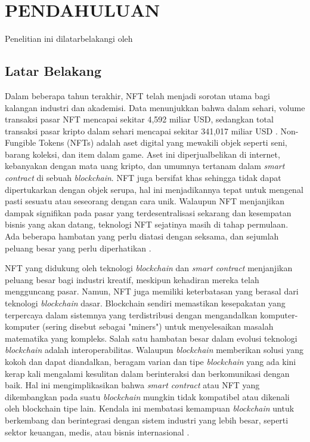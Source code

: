 \chapter{PENDAHULUAN}
\label{chap:pendahuluan}


Penelitian ini dilatarbelakangi oleh \lipsum[1][1-5]

\section{Latar Belakang}
\label{sec:latarbelakang}

Dalam beberapa tahun terakhir, NFT telah menjadi sorotan utama bagi kalangan industri dan akademisi. Data menunjukkan bahwa dalam sehari, volume transaksi pasar NFT mencapai sekitar 4,592 miliar USD, sedangkan total transaksi pasar kripto dalam sehari mencapai sekitar 341,017 miliar USD \parencite{Wang2021}. Non-Fungible Tokens (NFTs) adalah aset digital yang mewakili objek seperti seni, barang koleksi, dan item dalam game. Aset ini diperjualbelikan di internet, kebanyakan dengan mata uang kripto, dan umumnya tertanam dalam \emph{smart contract} di sebuah \emph{blockchain}. NFT juga bersifat khas sehingga tidak dapat dipertukarkan dengan objek serupa, hal ini menjadikannya tepat untuk mengenal pasti sesuatu atau seseorang dengan cara unik. Walaupun NFT menjanjikan dampak signifikan pada pasar yang terdesentralisasi sekarang dan kesempatan bisnis yang akan datang, teknologi NFT sejatinya masih di tahap permulaan. Ada beberapa hambatan yang perlu diatasi dengan seksama, dan sejumlah peluang besar yang perlu diperhatikan \parencite{Khan2021}.

NFT yang didukung oleh teknologi \emph{blockchain} dan \emph{smart contract} menjanjikan peluang besar bagi industri kreatif, meskipun kehadiran mereka telah mengguncang pasar. Namun, NFT juga memiliki keterbatasan yang berasal dari teknologi \emph{blockchain} dasar. Blockchain sendiri memastikan kesepakatan yang terpercaya dalam sistemnya yang terdistribusi dengan mengandalkan komputer-komputer (sering disebut sebagai "miners") untuk menyelesaikan masalah matematika yang kompleks. Salah satu hambatan besar dalam evolusi teknologi \emph{blockchain} adalah interoperabilitas. Walaupun \emph{blockchain} memberikan solusi yang kokoh dan dapat diandalkan, beragam varian dan tipe \emph{blockchain} yang ada kini kerap kali mengalami kesulitan dalam berinteraksi dan berkomunikasi dengan baik. Hal ini mengimplikasikan bahwa \emph{smart contract} atau NFT yang dikembangkan pada suatu \emph{blockchain} mungkin tidak kompatibel atau dikenali oleh blockchain tipe lain. Kendala ini membatasi kemampuan \emph{blockchain} untuk berkembang dan berintegrasi dengan sistem industri yang lebih besar, seperti sektor keuangan, medis, atau bisnis internasional \parencite{Malik2023}.

